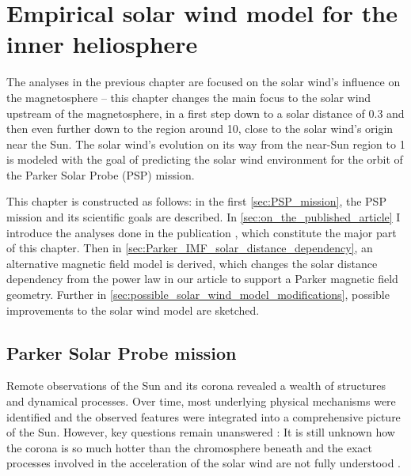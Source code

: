 
\chapter{Empirical solar wind model for the inner heliosphere}
\label{chap:empirical_solar_wind_model_for_the_inner_heliosphere}

The analyses in the previous chapter are focused on the solar wind's influence on the magnetosphere -- this chapter changes the main focus to the solar wind upstream of the magnetosphere, in a first step down to a solar distance of \SI{0.3}{\au} and then even further down to the region around \SI{10}{\Rs}, close to the solar wind's origin near the Sun. The solar wind's evolution on its way from the near-Sun region to \SI{1}{\au} is modeled with the goal of predicting the solar wind environment for the orbit of the Parker Solar Probe (PSP) mission.


This chapter is constructed as follows: in the first \autoref{sec:PSP_mission}, the PSP mission and its scientific goals are described. In \autoref{sec:on_the_published_article} I introduce the analyses done in the publication \citet{Venzmer2018}, which constitute the major part of this chapter. Then in \autoref{sec:Parker_IMF_solar_distance_dependency}, an alternative magnetic field model is derived, which changes the solar distance dependency from the power law in our article to support a Parker magnetic field geometry. Further in \autoref{sec:possible_solar_wind_model_modifications}, possible improvements to the solar wind model are sketched.


\section{Parker Solar Probe mission}
\label{sec:PSP_mission}
Remote observations of the Sun and its corona revealed a wealth of structures and dynamical processes. Over time, most underlying physical mechanisms were identified and the observed features were integrated into a comprehensive picture of the Sun. However, key questions remain unanswered \citep{McComas2007}: It is still unknown how the corona is so much hotter than the chromosphere beneath \citep{Klimchuk2006} and the exact processes involved in the acceleration of the solar wind are not fully understood \citep{Hollweg1985,Cranmer2017}.

